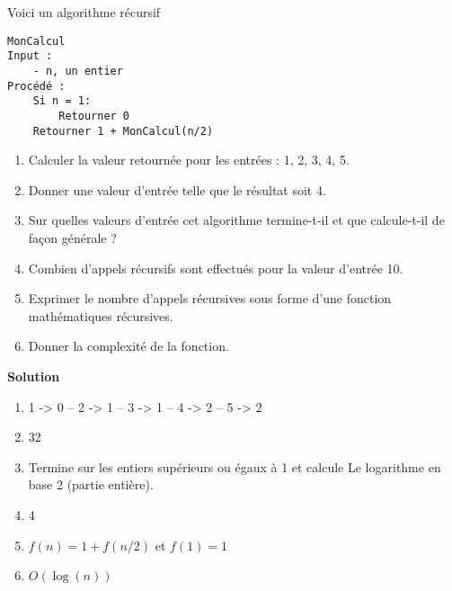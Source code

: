 
\begin{exercice}
Voici un algorithme récursif

\begin{lstlisting}
MonCalcul
Input :
    - n, un entier
Procédé :
    Si n = 1:
        Retourner 0
    Retourner 1 + MonCalcul(n/2)
\end{lstlisting}

\begin{enumerate}
\item Calculer la valeur retournée pour les entrées : 1, 2, 3, 4, 5.
\item Donner une valeur d'entrée telle que le résultat soit 4.
\item Sur quelles valeurs d'entrée cet algorithme termine-t-il et que calcule-t-il de façon générale ?
\item Combien d'appels récursifs sont effectués pour la valeur d'entrée 10.
\item Exprimer le nombre d'appels récursives sous forme d'une fonction mathématiques récursives.
\item Donner la complexité de la fonction.
\end{enumerate}

\textbf{Solution}

\begin{enumerate}
\item 1 -> 0 -- 2 -> 1 -- 3 -> 1 -- 4 -> 2 -- 5 -> 2
\item 32
\item Termine sur les entiers supérieurs ou égaux à 1 et calcule Le logarithme en base 2 (partie entière).
\item 4
\item $f(n) = 1 + f(n/2)$ et $f(1) = 1$ 
\item $O(\log(n))$
\end{enumerate}
\end{exercice}